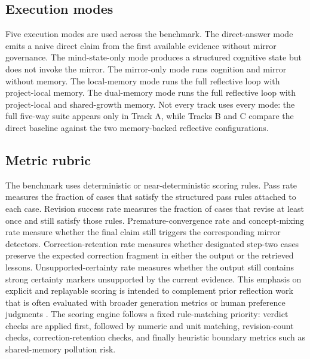 \documentclass[12pt]{article}
\begin{document}
\subsection{Execution modes}

Five execution modes are used across the benchmark. The direct-answer mode emits a naive direct claim from the first available evidence without mirror governance. The mind-state-only mode produces a structured cognitive state but does not invoke the mirror. The mirror-only mode runs cognition and mirror without memory. The local-memory mode runs the full reflective loop with project-local memory. The dual-memory mode runs the full reflective loop with project-local and shared-growth memory. Not every track uses every mode: the full five-way suite appears only in Track A, while Tracks B and C compare the direct baseline against the two memory-backed reflective configurations.

\subsection{Metric rubric}

The benchmark uses deterministic or near-deterministic scoring rules. Pass rate measures the fraction of cases that satisfy the structured pass rules attached to each case. Revision success rate measures the fraction of cases that revise at least once and still satisfy those rules. Premature-convergence rate and concept-mixing rate measure whether the final claim still triggers the corresponding mirror detectors. Correction-retention rate measures whether designated step-two cases preserve the expected correction fragment in either the output or the retrieved lessons. Unsupported-certainty rate measures whether the output still contains strong certainty markers unsupported by the current evidence. This emphasis on explicit and replayable scoring is intended to complement prior reflection work that is often evaluated with broader generation metrics or human preference judgments \cite{selfrefine,reflexion,critic,academicresponse}. The scoring engine follows a fixed rule-matching priority: verdict checks are applied first, followed by numeric and unit matching, revision-count checks, correction-retention checks, and finally heuristic boundary metrics such as shared-memory pollution risk.
\end{document}
